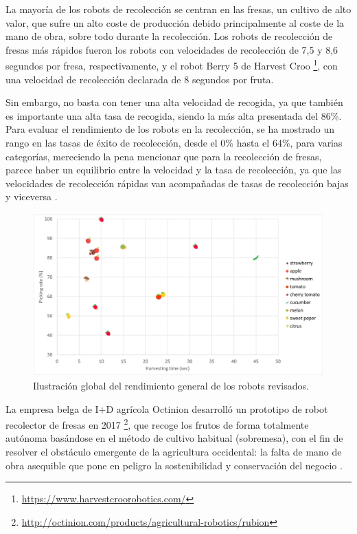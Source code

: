 La mayoría de los robots de recolección se centran en las fresas, un cultivo de alto valor, que sufre un alto coste de producción debido principalmente al coste de la mano de obra, sobre todo durante la recolección. Los robots de recolección de fresas más rápidos fueron los robots con velocidades de recolección de 7,5 y 8,6 segundos por fresa, respectivamente, y el robot Berry 5 de Harvest Croo \footnote{\url{https://www.harvestcroorobotics.com/}}, con una velocidad de recolección declarada de 8 segundos por fruta. 

Sin embargo, no basta con tener una alta velocidad de recogida, ya que también es importante una alta tasa de recogida, siendo la más alta presentada del 86\%. 
Para evaluar el rendimiento de los robots en la recolección, se ha mostrado un rango en las tasas de éxito de recolección, desde el 0\% hasta el 64\%, para varias categorías, mereciendo la pena mencionar que para la recolección de fresas, parece haber un equilibrio entre la velocidad y la tasa de recolección, ya que las velocidades de recolección rápidas van acompañadas de tasas de recolección bajas y viceversa \cite{Fountas20}. 

\begin{figure} [h!]
    \begin{center}
      \includegraphics[width=15cm]{figs/Rendimiento cosecha robots.png}
    \end{center}
    \caption{Ilustración global del rendimiento general de los robots revisados.}
    \label{fig:RendimientosCosecha}
\end{figure}
\pagebreak

La empresa belga de I+D agrícola Octinion desarrolló un prototipo de robot recolector de fresas en 2017 \footnote{\url{http://octinion.com/products/agricultural-robotics/rubion}}, que recoge los frutos de forma totalmente autónoma basándose en el método de cultivo habitual (sobremesa), con el fin de resolver el obstáculo emergente de la agricultura occidental: la falta de mano de obra asequible que pone en peligro la sostenibilidad y conservación del negocio \cite{DePreter18}.

